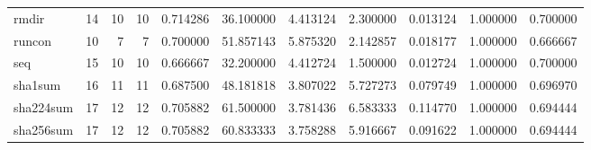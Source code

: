 \begin{tabular}{lrrrrrrrrrr}
rmdir     &                                      14 &                 10 &                                10 &                                   0.714286 &                              36.100000 &                                     4.413124 &                          2.300000 &                                0.013124 &                           1.000000 &                                           0.700000 \\
runcon    &                                      10 &                  7 &                                 7 &                                   0.700000 &                              51.857143 &                                     5.875320 &                          2.142857 &                                0.018177 &                           1.000000 &                                           0.666667 \\
seq       &                                      15 &                 10 &                                10 &                                   0.666667 &                              32.200000 &                                     4.412724 &                          1.500000 &                                0.012724 &                           1.000000 &                                           0.700000 \\
sha1sum   &                                      16 &                 11 &                                11 &                                   0.687500 &                              48.181818 &                                     3.807022 &                          5.727273 &                                0.079749 &                           1.000000 &                                           0.696970 \\
sha224sum &                                      17 &                 12 &                                12 &                                   0.705882 &                              61.500000 &                                     3.781436 &                          6.583333 &                                0.114770 &                           1.000000 &                                           0.694444 \\
sha256sum &                                      17 &                 12 &                                12 &                                   0.705882 &                              60.833333 &                                     3.758288 &                          5.916667 &                                0.091622 &                           1.000000 &                                           0.694444 \\

\end{tabular}
